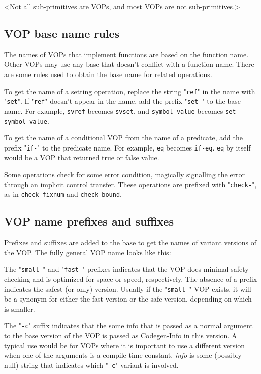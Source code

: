 \comment<Not all sub-primitives are VOPs, and most VOPs are not sub-primitives.>



\subsection{VOP base name rules}

The names of VOPs that implement functions are based on the function name.
Other VOPs may use any base that doesn't conflict with a function name.  There
are some rules used to obtain the base name for related operations.

To get the name of a setting operation, replace the string "{\tt ref}" in the name
with "{\tt set}".  If "{\tt ref}" doesn't appear in the name, add the prefix "{\tt set-}" to the
base name.  For example, {\tt svref} becomes {\tt svset}, and {\tt symbol-value}
becomes {\tt set-symbol-value}.

To get the name of a conditional VOP from the name of a predicate, add the
prefix "{\tt if-}" to the predicate name.  For example, {\tt eq} becomes {\tt if-eq}.
{\tt eq} by itself would be a VOP that returned true or false value.

Some operations check for some error condition, magically signalling the error
through an implicit control transfer.  These operations are prefixed with
"{\tt check-}", as in {\tt check-fixnum} and {\tt check-bound}.



\subsection{VOP name prefixes and suffixes}

Prefixes and suffixes are added to the base to get the names of variant
versions of the VOP.  The fully general VOP name looks like this:
\begin{format}
   {"{\tt small-}" | "{\tt fast-}"} {\it name}{"{\tt -c}" {\it info}}{"{\tt /}" {\it type}{"{\tt =>}" {\it result-type}}
\end{format}
The "{\tt small-}" and "{\tt fast-}" prefixes indicates that the VOP does minimal
safety checking and is optimized for space or speed, respectively.  The absence
of a prefix indicates the safest (or only) version.  Usually if the "{\tt small-}"
VOP exists, it will be a synonym for either the fast version or the safe
version, depending on which is smaller.

The "{\tt -c}" suffix indicates that the some info that is passed as a normal
argument to the base version of the VOP is passed as Codegen-Info in this
version.  A typical use would be for VOPs where it is important to use a
different version when one of the arguments is a compile time constant.
{\it info} is some (possibly null) string that indicates which "{\tt -c}" variant
is involved.


